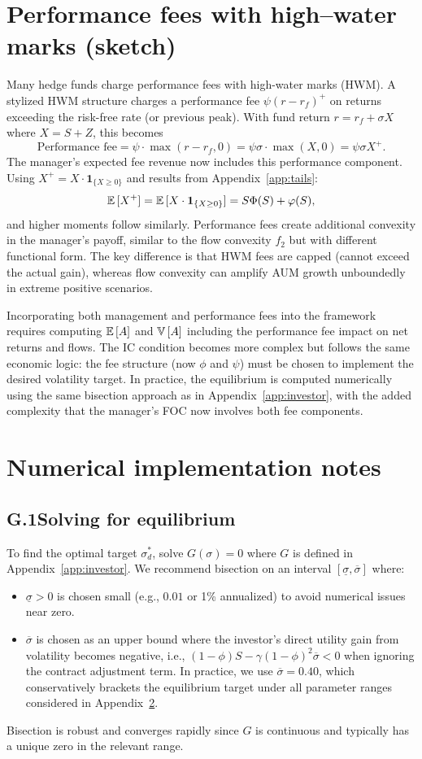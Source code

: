 \section{Performance fees with high--water marks (sketch)}
\label{app:perf-fee}
Many hedge funds charge performance fees with high-water marks (HWM). A stylized HWM structure charges a performance fee $\psi(r-r_f)^+$ on returns exceeding the risk-free rate (or previous peak). With fund return $r=r_f+\sigma X$ where $X=S+Z$, this becomes
\[
\text{Performance fee} = \psi\cdot\max(r-r_f, 0) = \psi\sigma\cdot\max(X, 0) = \psi\sigma X^+.
\]
The manager's expected fee revenue now includes this performance component. Using $X^+ = X\cdot\mathbf{1}_{\{X\ge 0\}}$ and results from Appendix~\ref{app:tails}:
\[
{\mathbb{E}}\,[X^+] = {\mathbb{E}}\,[X\cdot\mathbf{1}_{\{X\ge 0\}}] = S\Phi(S) + \varphi(S),
\]
and higher moments follow similarly. Performance fees create additional convexity in the manager's payoff, similar to the flow convexity $f_2$ but with different functional form. The key difference is that HWM fees are capped (cannot exceed the actual gain), whereas flow convexity can amplify AUM growth unboundedly in extreme positive scenarios.

Incorporating both management and performance fees into the framework requires computing ${\mathbb{E}}\,[A]$ and ${\mathbb{V}}\,[A]$ including the performance fee impact on net returns and flows. The IC condition becomes more complex but follows the same economic logic: the fee structure (now $\phi$ and $\psi$) must be chosen to implement the desired volatility target. In practice, the equilibrium is computed numerically using the same bisection approach as in Appendix~\ref{app:investor}, with the added complexity that the manager's FOC now involves both fee components.

\section{Numerical implementation notes}
\label{app:numerical}

\subsection*{G.1\quad Solving for equilibrium}
To find the optimal target $\sigma_d^*$, solve $G(\sigma)=0$ where $G$ is defined in Appendix~\ref{app:investor}. We recommend bisection on an interval $[\underline\sigma,\overline\sigma]$ where:
\begin{itemize}
\item $\underline\sigma > 0$ is chosen small (e.g., $0.01$ or 1\% annualized) to avoid numerical issues near zero.
\item $\overline\sigma$ is chosen as an upper bound where the investor's direct utility gain from volatility becomes negative, i.e., $(1-\phi)S - \gamma(1-\phi)^2\overline\sigma < 0$ when ignoring the contract adjustment term. In practice, we use $\overline\sigma = 0.40$, which conservatively brackets the equilibrium target under all parameter ranges considered in Appendix~\ref{app:numerical}.
\end{itemize}
Bisection is robust and converges rapidly since $G$ is continuous and typically has a unique zero in the relevant range.


